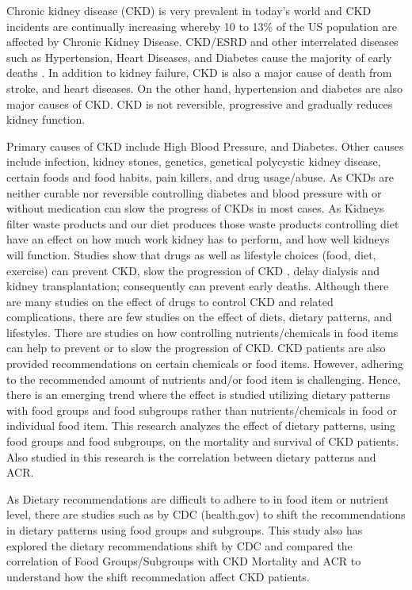 \noindent  Chronic kidney disease (CKD) is very prevalent in today’s world and CKD incidents are continually increasing whereby 10 to 13\% of the US population are affected by Chronic Kidney Disease\cite{Jaimonetal2017}. CKD/ESRD and other interrelated diseases such as Hypertension, Heart Diseases, and Diabetes cause the majority of early  deaths \cite{Hannan2019}. In addition to kidney failure, CKD is also a major cause of death from stroke, and heart diseases. On the other hand, hypertension and diabetes are also major causes of CKD. CKD is not reversible, progressive and gradually reduces kidney function. 

\medskip

\noindent Primary causes of CKD include High Blood Pressure, and Diabetes. Other causes include infection, kidney stones, genetics, genetical polycystic kidney disease, certain foods and food habits, pain killers, and drug usage/abuse. As CKDs are neither curable nor reversible controlling diabetes and blood pressure with or without medication can slow the progress of CKDs in most cases. As Kidneys filter waste products and our diet produces those waste products controlling diet have an effect on how much work kidney has to perform, and how well kidneys will function. Studies show that drugs as well as lifestyle choices (food, diet, exercise) can prevent CKD, slow the progression of CKD \cite{Jaceketal2017}, delay dialysis and kidney transplantation; consequently can prevent early deaths. Although there are many studies on the effect of drugs to control CKD and related complications, there are few studies on the effect of diets, dietary patterns, and lifestyles\cite{Jaceketal2017}. There  are studies on how controlling nutrients/chemicals in food items can help to prevent or to slow the progression of CKD. CKD patients are also provided recommendations on certain chemicals or food items. However, adhering to the recommended amount of nutrients and/or food item is challenging. Hence, there is an emerging trend where the effect is studied utilizing  dietary patterns with food groups and food subgroups rather than nutrients/chemicals in food or individual food item. This research analyzes the effect of dietary patterns, using food groups and food subgroups, on  the mortality and survival of CKD patients. Also studied in this research is the correlation between dietary patterns and ACR. 

As Dietary recommendations are difficult to adhere to in food item or nutrient level, there are studies such as by CDC (health.gov) to shift the recommendations in dietary patterns using food groups and subgroups. This study also has explored the dietary recommendations shift by CDC and compared the correlation of Food Groups/Subgroups with CKD Mortality and ACR to understand how the shift recommedation affect CKD patients.

